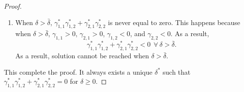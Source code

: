 \documentclass[14pt]{article}
\begin{document}
{\begin{proof}
\begin{enumerate}
	    \item When $\delta > \bar{\delta}$, $\gamma_{1,1}^*\gamma_{1,2}^* + \gamma_{2,1}^*\gamma_{2,2}^*$ is never equal to zero. This happens because when $\delta > \bar{\delta}$, $\gamma_{1,1} > 0$, $\gamma_{2,1} > 0$, $\gamma_{1,2} < 0$, and $\gamma_{2,2} < 0$. As a result,
	    $$
	    \gamma_{1,1}^* \gamma_{1,2}^* + \gamma_{2,1}^* \gamma_{2,2}^* < 0 \ \ \forall \ \delta > \bar{\delta}.
	    $$ 
	    As a result, solution cannot be reached when $\delta > \bar{\delta}$.
	\end{enumerate}

This complete the proof. It always exists a unique $\delta^*$ such that $\gamma_{1,1}^*\gamma_{1,2}^* + \gamma_{2,1}^*\gamma_{2,2}^* = 0$ for $\delta \geq 0$.
\end{proof}





















}
\end{document}
